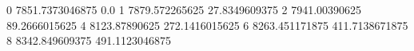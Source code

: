 0 7851.7373046875 0.0
1 7879.572265625 27.8349609375
2 7941.00390625 89.2666015625
4 8123.87890625 272.1416015625
6 8263.451171875 411.7138671875
8 8342.849609375 491.1123046875
